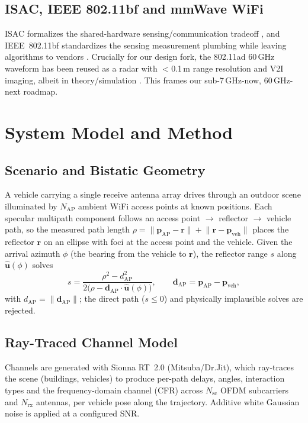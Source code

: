 \documentclass[journal]{IEEEtran}
\newcommand{\SI}[2]{#1\,#2}
\begin{document}
\subsection{ISAC, IEEE 802.11bf and mmWave WiFi}
ISAC formalizes the shared-hardware sensing/communication tradeoff
\cite{liu2022isac,xiong2023scfundamental,zhang2021jcassurvey}, and IEEE~802.11bf
standardizes the sensing measurement plumbing while leaving algorithms to vendors
\cite{overview2024ieee80211bf}. Crucially for our design fork, the 802.11ad
\SI{60}{GHz} waveform has been reused as a radar with $<$\SI{0.1}{m} range
resolution and V2I imaging, albeit in theory/simulation
\cite{kumari2018adradar,han2022adimaging}. This frames our sub-\SI{7}{GHz}-now,
\SI{60}{GHz}-next roadmap.

\section{System Model and Method}\label{sec:method}
\subsection{Scenario and Bistatic Geometry}
A vehicle carrying a single receive antenna array drives through an outdoor scene
illuminated by $N_\mathrm{AP}$ ambient WiFi access points at known positions.
Each specular multipath component follows an access point $\rightarrow$ reflector
$\rightarrow$ vehicle path, so the measured path length
$\rho = \lVert\mathbf{p}_\mathrm{AP}-\mathbf{r}\rVert +
\lVert\mathbf{r}-\mathbf{p}_\mathrm{veh}\rVert$ places the reflector $\mathbf{r}$ on
an ellipse with foci at the access point and the vehicle. Given the arrival azimuth
$\phi$ (the bearing from the vehicle to $\mathbf{r}$), the reflector range $s$ along
$\hat{\mathbf u}(\phi)$ solves
\begin{equation}
s = \frac{\rho^2 - d_\mathrm{AP}^2}{2\big(\rho - \mathbf{d}_\mathrm{AP}\!\cdot\!\hat{\mathbf u}(\phi)\big)},
\qquad \mathbf{d}_\mathrm{AP} = \mathbf{p}_\mathrm{AP}-\mathbf{p}_\mathrm{veh},
\label{eq:bistatic}
\end{equation}
with $d_\mathrm{AP}=\lVert\mathbf{d}_\mathrm{AP}\rVert$; the direct path
($s\!\le\!0$) and physically implausible solves are rejected.

\subsection{Ray-Traced Channel Model}
Channels are generated with Sionna RT~2.0 (Mitsuba/Dr.Jit), which ray-traces the
scene (buildings, vehicles) to produce per-path delays, angles, interaction types
and the frequency-domain channel (CFR) across $N_\mathrm{sc}$ OFDM subcarriers and
$N_\mathrm{rx}$ antennas, per vehicle pose along the trajectory. Additive white
Gaussian noise is applied at a configured SNR.
\end{document}
